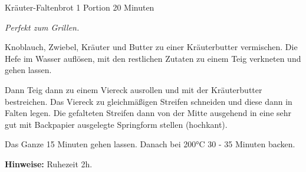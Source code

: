 \begin{recipe}{Kräuter-Faltenbrot} {1 Portion} {20 Minuten}

  \freeform
  \textit{Perfekt zum Grillen.}
  
  
  Knoblauch, Zwiebel, Kräuter und Butter zu einer Kräuterbutter vermischen.
  Die Hefe im Wasser auflösen, mit den restlichen Zutaten zu einem Teig verkneten und gehen lassen.

  \newstep
  Dann Teig dann zu einem Viereck ausrollen und mit der Kräuterbutter bestreichen.
  Das Viereck zu gleichmäßigen Streifen schneiden und diese dann in Falten legen.
  Die gefalteten Streifen dann von der Mitte ausgehend in eine sehr gut mit Backpapier ausgelegte Springform stellen (hochkant).

  \newstep
  Das Ganze 15 Minuten gehen lassen. Danach bei 200°C 30 - 35 Minuten backen.
  
  \freeform
  \hrulefill
  
  \freeform
  \textbf{Hinweise:}
  Ruhezeit 2h.
  
  \end{recipe}
  